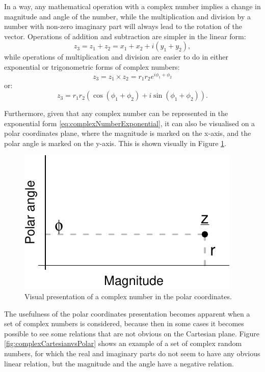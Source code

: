 \documentclass[
]{book}
\begin{document}
In a way, any mathematical operation with a complex number implies a change in magnitude and angle of the number, while the multiplication and division by a number with non-zero imaginary part will always lead to the rotation of the vector. Operations of addition and subtraction are simpler in the linear form:
\begin{equation*}
    z_3 = z_1 + z_2 = x_1 + x_2 + i (y_1 + y_2) ,
\end{equation*}
while operations of multiplication and division are easier to do in either exponential or trigonometric forms of complex numbers:
\begin{equation*}
    z_3 = z_1 \times z_2 = r_1 r_2 e^{i \phi_1 + \phi_2} 
\end{equation*}
or:
\begin{equation*}
    z_3 = r_1 r_2 \left(\cos (\phi_1 + \phi_2) + i \sin (\phi_1 + \phi_2) \right) .
\end{equation*}

Furthermore, given that any complex number can be represented in the exponential form \eqref{eq:complexNumberExponential}, it can also be visualised on a polar coordinates plane, where the magnitude is marked on the x-axis, and the polar angle is marked on the y-axis. This is shown visually in Figure \ref{fig:complexPlanePolar}.

\begin{figure}
\centering
\includegraphics{Svetunkov---Svetunkov---Complex-Dynamic-Models_files/figure-latex/complexPlanePolar-1.pdf}
\caption{\label{fig:complexPlanePolar}Visual presentation of a complex number in the polar coordinates.}
\end{figure}

The usefulness of the polar coordinates presentation becomes apparent when a set of complex numbers is considered, because then in some cases it becomes possible to see some relations that are not obvious on the Cartesian plane. Figure \ref{fig:complexCartesianvsPolar} shows an example of a set of complex random numbers, for which the real and imaginary parts do not seem to have any obvious linear relation, but the magnitude and the angle have a negative relation.
\end{document}
